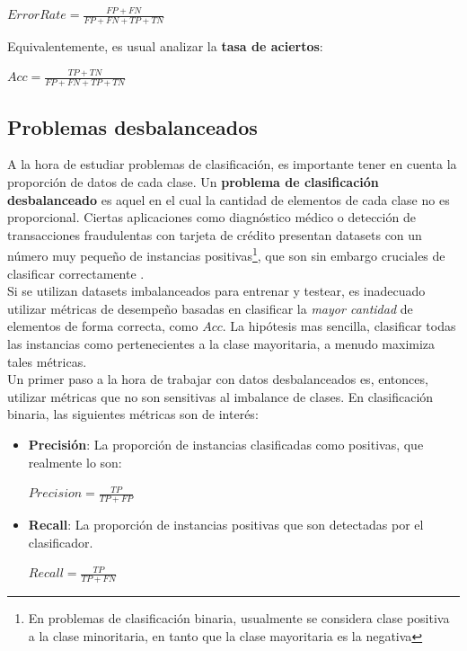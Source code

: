 \begin{center}
$ Error Rate = \frac{FP + FN}{FP + FN + TP + TN} $
\end{center}

Equivalentemente, es usual analizar la \textbf{tasa de aciertos}:

\begin{center}
$ Acc = \frac{TP + TN}{FP + FN + TP + TN} $
\end{center}

\subsection{Problemas desbalanceados}
\label{imbalance}

A la hora de estudiar problemas de clasificación, es importante tener en cuenta la proporción de datos de cada clase. Un \textbf{problema de clasificación desbalanceado} es aquel en el cual la cantidad de elementos de cada clase no es proporcional. Ciertas aplicaciones como diagnóstico médico o detección de transacciones fraudulentas con tarjeta de crédito presentan datasets con un número muy pequeño de instancias positivas\footnote{En problemas de clasificación binaria, usualmente se considera clase positiva a la clase minoritaria, en tanto que la clase mayoritaria es la negativa}, que son sin embargo cruciales de clasificar correctamente \cite{imbalanced_svm}. \\

Si se utilizan datasets imbalanceados para entrenar y testear, es inadecuado utilizar métricas de desempeño basadas en clasificar la \textit{mayor cantidad} de elementos de forma correcta, como $Acc$. La hipótesis mas sencilla, clasificar todas las instancias como pertenecientes a la clase mayoritaria, a menudo maximiza tales métricas. \\

Un primer paso a la hora de trabajar con datos desbalanceados es, entonces, utilizar métricas que no son sensitivas al imbalance de clases. En clasificación binaria, las siguientes métricas son de interés:

\begin{itemize}
\item \textbf{Precisión}: La proporción de instancias clasificadas como positivas, que realmente lo son:
\begin{center}
$ Precision =  \frac{TP}{TP + FP}$
\end{center}

\item \textbf{Recall}: La proporción de instancias positivas que son detectadas por el clasificador.
\begin{center}
$ Recall =  \frac{TP}{TP + FN}$
\end{center}

\end{itemize}

